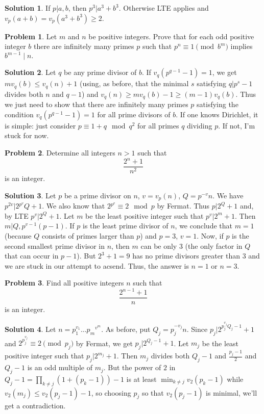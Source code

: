\documentclass{article}
\theoremstyle{definition}
\newtheorem{problem}{Problem}
\newtheorem*{solution}{Solution}
\begin{document}
\begin{solution}
If $p|a,b$, then $p^3|a^3+b^3$. Otherwise LTE applies and $v_p(a+b)=v_p(a^3+b^3)\ge 2$.
\end{solution}

\begin{problem}
Let $m$ and $n$ be positive integers. Prove that for each odd positive integer $b$ there are infinitely many primes $p$ such that $p^n \equiv 1 \pmod{b^m}$ implies $b^{m-1} \mid n.$
\end{problem}

\begin{solution}
Let $q$ be any prime divisor of $b$. If $v_q(p^{q-1}-1)=1$, we get $mv_q(b)\le v_q(n)+1$ (using, as before, that the minimal $s$ satisfying $q|p^s-1$ divides both $n$ and $q-1$) and $v_q(n)\ge mv_q(b)-1\ge (m-1)v_q(b)$. Thus we just need to show that there are infinitely many primes $p$ satisfying the condition $v_q(p^{q-1}-1)=1$ for all prime divisors of $b$. If one knows Dirichlet, it is simple: just consider $p\equiv 1+q\mod q^2$ for all primes $q$ dividing $p$. If not, I'm stuck for now.
\end{solution}

\begin{problem}
Determine all integers $ n > 1$ such that $$\frac {2^n + 1}{n^2}$$ is an integer.
\end{problem}

\begin{solution}
Let $p$ be a prime divisor on $n$, $v=v_p(n)$, $Q=p^{-v}n$. We have $p^{2v}|2{}^{p{}^v}Q+1$. We also know that $2{}^{p{}^v}\equiv 2\mod p$ by Fermat. Thus $p|2^Q+1$ and, by LTE $p^v|2^Q+1$. Let $m$ be the least positive integer such that $p^v|2^m+1$. Then $m|Q,p^{v-1}(p-1)$. If $p$ is the least prime divisor of $n$, we conclude that $m=1$ (because $Q$ consists of primes larger than $p$) and $p=3$, $v=1$. Now, if $p$ is the second smallest prime divisor in $n$, then $m$ can be only $3$ (the only factor in $Q$ that can occur in $p-1$). But $2^3+1=9$ has no prime divisors greater than $3$ and we are stuck in our attempt to acsend. Thus, the answer is $n=1$ or $n=3$.
\end{solution}

\begin{problem}
Find all positive integers $n$ such that $$\frac{2^{n-1}+1}{n}$$ is an integer.
\end{problem}

\begin{solution}
Let $n=p_1^{v_1}\dots p_m{}^{v{}^m}$. As before, put $Q_j=p_j^{-v_j}n$. Since $p_j|2^{p_j^{v_j}Q_j-1}+1$ and $2^{p_j^{v_j}}\equiv 2\pmod{p_j}$ by Fermat, we get $p_j|2^{Q_j-1}+1$. Let $m_j$ be the least positive integer such that $p_j|2^{m_j}+1$. Then $m_j$ divides both $Q_j-1$ and $\frac{p_j-1}2$ and $Q_j-1$ is an odd multiple of $m_j$. But the power of $2$ in $Q_j-1=\prod_{k\ne j}(1+(p_k-1))-1$ is at least $\min_{k\ne j}v_2(p_k-1)$ while $v_2(m_j)\le v_2(p_j-1)-1$, so choosing $p_j$ so that $v_2(p_j-1)$ is minimal, we'll get a contradiction.
\end{solution}
\end{document}
